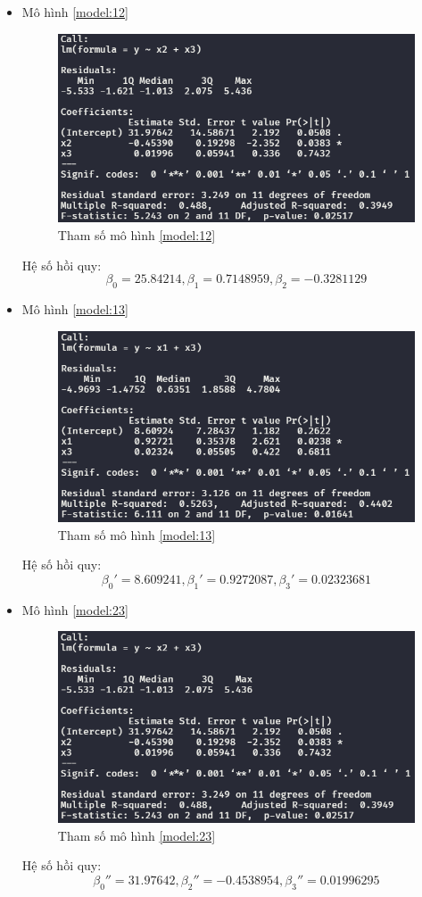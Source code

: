 \documentclass[a4paper]{article}
\theoremstyle{nonumberplain}
\begin{document}
\begin{itemize}
	\item Mô hình \ref{model:12}
	\begin{figure}[h!]
		\centering
		\includegraphics[width=0.7\linewidth]{bai-3-5-model-1}
		\caption{Tham số mô hình \ref{model:12}}
		\label{fig:bai-3-5-model-1}
	\end{figure}
	
	Hệ số hồi quy:
	\[\beta_0=25.84214, \beta_1=0.7148959, \beta_2=-0.3281129\]
	
	\item Mô hình \ref{model:13}
	\begin{figure}[h]
		\centering
		\includegraphics[width=0.7\linewidth]{bai-3-5-model-2}
		\caption{Tham số mô hình \ref{model:13}}
		\label{fig:bai-3-5-model-2}
	\end{figure}
	
	Hệ số hồi quy:
	\[\beta_0'=8.609241, \beta_1'=0.9272087, \beta_3'=0.02323681\]
	
	\item Mô hình \ref{model:23}
	\begin{figure}[h]
		\centering
		\includegraphics[width=0.7\linewidth]{bai-3-5-model-3}
		\caption{Tham số mô hình \ref{model:23}}
		\label{fig:bai-3-5-model-3}
	\end{figure}

	Hệ số hồi quy:
	\[\beta_0''=31.97642, \beta_2''=-0.4538954, \beta_3''=0.01996295\]
\end{itemize}
\end{document}
